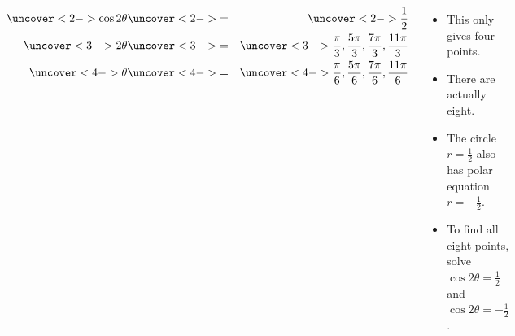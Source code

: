 \begin{frame}
\begin{example}[Example 3, p. 688]
\begin{columns}[c]
{}%
%

\abovedisplayskip=0pt
\belowdisplayskip=0pt
\begin{eqnarray*}
\uncover<2->{%
\cos 2\theta%
}%
& \uncover<2->{ = } &%
\uncover<2->{%
\frac{1}{2}%
}\\%
\uncover<3->{%
2\theta%
}%
& \uncover<3->{ = } &%
\uncover<3->{%
\frac{\pi}{3}, \frac{5\pi}{3}, \frac{7\pi}{3}, \frac{11\pi}{3}%
}\\%
\uncover<4->{%
\theta%
}%
& \uncover<4->{ = } &%
\uncover<4->{%
\frac{\pi}{6}, \frac{5\pi}{6}, \frac{7\pi}{6}, \frac{11\pi}{6}%
}%
\end{eqnarray*}
\begin{itemize}
\item<5->  This only gives four points.
\item<6->  There are actually eight.
\item<7->  The circle $r = \frac{1}{2}$ also has polar equation $r = -\frac{1}{2}$.
\item<8->  To find all eight points, solve \alert<handout:0| 9>{$\cos 2\theta = \frac{1}{2}$} and \alert<handout:0| 10>{$\cos 2\theta = -\frac{1}{2}$}.
\end{itemize}
\end{columns}
\end{example}
\end{frame}
